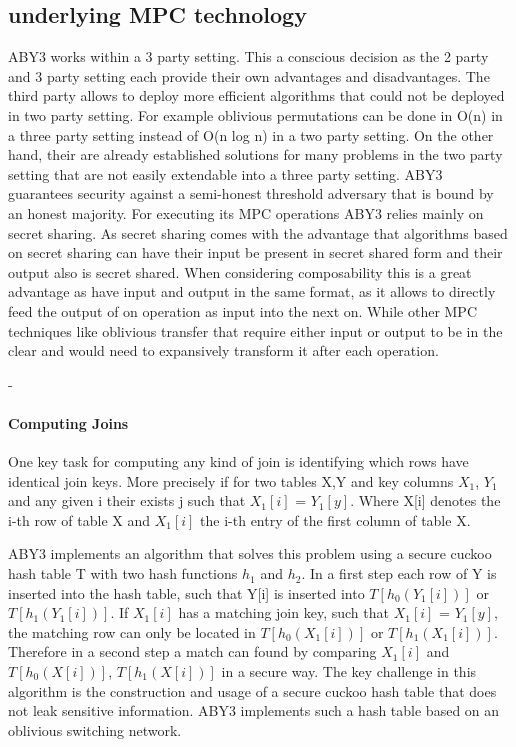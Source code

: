 \subsection{underlying MPC technology}
ABY3 works within a 3 party setting. This a conscious decision as the 2 party and 3 party setting each provide their own advantages and disadvantages.
The third party allows to deploy more efficient algorithms that could not be deployed in two party setting. For example oblivious permutations can be done in O(n) in a three party setting instead of O(n log n) in a two party setting. On the other hand, their are already established solutions for many problems in the two party setting that are not easily extendable into a three party setting. ABY3 guarantees security against a semi-honest threshold adversary that is bound by an honest majority. For executing its MPC operations ABY3 relies mainly on secret sharing. As secret sharing comes with the advantage that algorithms based on secret sharing can have their input be present in secret shared form and their output also is secret shared. When considering composability this is a great advantage as have input and output in the same format, as it allows to directly feed the output of on operation as input into the next on. While other MPC techniques like oblivious transfer that require either input or output to be in the clear and would need to expansively transform it after each operation. 

-%





\paragraph{Computing Joins}
One key task for computing any kind of join is identifying which rows have identical join keys. More precisely if for two tables X,Y and key columns $X_1$, $Y_1$ and any given i  their exists j such that $X_1[i]$ = $Y_1[y]$. Where X[i] denotes the i-th row of table X and $ X_1[i] $ the i-th entry of the first column of table X. 

ABY3 implements an algorithm that solves this problem using a secure cuckoo hash table T with two hash functions $ h_1 $ and $h_2$. 
In a first step each row of Y is inserted into the hash table, such that Y[i] is inserted into $ T[h_0(Y_1 [i]  )] $ or $T[h_1(Y_1 [i]  )] $. 
If $X_1[i]$ has a matching join key, such that  $X_1[i]$ = $Y_1[y]$,  the matching row can only be located in $ T[h_0(X_1[i])] $ or  $T[h_1( X_1[i])] $. 
Therefore in a second step a match can found by comparing $X_1[i]$ and $ T[h_0(X[i])] $,  $T[h_1(X[i])] $ in a secure way. The key challenge in this algorithm is the construction and usage of a secure cuckoo hash table that does not leak sensitive information. ABY3 implements such a hash table based on an oblivious switching network.
